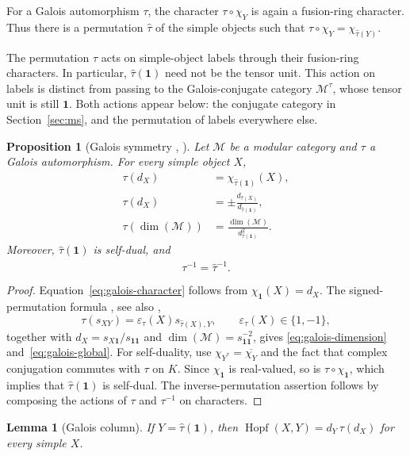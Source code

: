 \documentclass[11pt,oneside]{amsart}
\newtheorem{lemma}[theorem]{Lemma}
\newtheorem{proposition}[theorem]{Proposition}
\theoremstyle{remark}
\newcommand{\M}{\mathcal M}
\newcommand{\one}{\mathbf 1}
\newcommand{\Hopf}{\operatorname{Hopf}}
\newcommand{\htau}{\hat\tau}
\begin{document}
For a Galois automorphism $\tau$, the character $\tau\circ\chi_Y$ is again a
fusion-ring character. Thus there is a permutation $\htau$ of the simple
objects such that $\tau\circ\chi_Y=\chi_{\htau(Y)}$.

The permutation $\htau$ acts on simple-object labels through their fusion-ring
characters. In particular, $\htau(\one)$ need not be the tensor unit. This
action on labels is distinct from passing to the Galois-conjugate category
$\M^\tau$, whose tensor unit is still $\one$. Both actions appear below: the
conjugate category in Section~\ref{sec:ms}, and the permutation of labels
everywhere else.

\begin{proposition}[Galois symmetry {\cite{CG}, \cite[\S4.1]{DLN}}]\label{prop:galois}
Let $\M$ be a modular category and $\tau$ a Galois automorphism. For every
simple object $X$,
\begin{align}
\tau(d_X)&=\chi_{\htau(\one)}(X),\label{eq:galois-character}\\
\tau(d_X)&=\pm\frac{d_{\htau(X)}}{d_{\htau(\one)}},\label{eq:galois-dimension}\\
\tau(\dim(\M))&=\frac{\dim(\M)}{d_{\htau(\one)}^2}.\label{eq:galois-global}
\end{align}
Moreover, $\htau(\one)$ is self-dual, and
\begin{equation}\label{eq:galois-inverse}
\widehat{\tau^{-1}}=\htau^{-1}.
\end{equation}
\end{proposition}

\begin{proof}
Equation~\eqref{eq:galois-character} follows from $\chi_{\one}(X)=d_X$.
The signed-permutation formula \cite[(4.3)]{DLN}, see also
\cite[Theorem~10.1]{ENO},
\[
\tau(s_{XY})=\varepsilon_\tau(X)s_{\htau(X),Y},\qquad
\varepsilon_\tau(X)\in\{1,-1\},
\]
together with $d_X=s_{X\one}/s_{\one\one}$ and
$\dim(\M)=s_{\one\one}^{-2}$, gives
\eqref{eq:galois-dimension} and~\eqref{eq:galois-global}.
For self-duality, use
$\chi_{Y^*}=\overline{\chi_Y}$ and the fact that complex conjugation commutes
with $\tau$ on $K$. Since $\chi_{\one}$ is real-valued, so is
$\tau\circ\chi_{\one}$, which implies that $\htau(\one)$ is self-dual.
The inverse-permutation assertion follows by composing the actions of
$\tau$ and $\tau^{-1}$ on characters.
\end{proof}

\begin{lemma}[Galois column]\label{lem:galcol}
If $Y=\htau(\one)$, then
$\Hopf(X,Y)=d_Y\,\tau(d_X)$ for every simple $X$.
\end{lemma}
\end{document}
